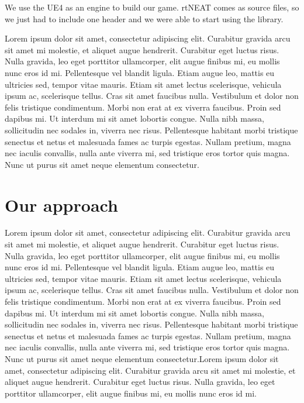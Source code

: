 \documentclass[conference]{acmsiggraph}
\begin{document}
We use the UE4 as an engine to build our game. rtNEAT comes as source files, so we just had to include one header and we were able to start using the library.

Lorem ipsum dolor sit amet, consectetur adipiscing elit. Curabitur gravida arcu sit amet mi molestie, et aliquet augue hendrerit. Curabitur eget luctus risus. Nulla gravida, leo eget porttitor ullamcorper, elit augue finibus mi, eu mollis nunc eros id mi. Pellentesque vel blandit ligula. Etiam augue leo, mattis eu ultricies sed, tempor vitae mauris. Etiam sit amet lectus scelerisque, vehicula ipsum ac, scelerisque tellus. Cras sit amet faucibus nulla. Vestibulum et dolor non felis tristique condimentum. Morbi non erat at ex viverra faucibus. Proin sed dapibus mi. Ut interdum mi sit amet lobortis congue. Nulla nibh massa, sollicitudin nec sodales in, viverra nec risus. Pellentesque habitant morbi tristique senectus et netus et malesuada fames ac turpis egestas. Nullam pretium, magna nec iaculis convallis, nulla ante viverra mi, sed tristique eros tortor quis magna. Nunc ut purus sit amet neque elementum consectetur.

\section{Our approach}

Lorem ipsum dolor sit amet, consectetur adipiscing elit. Curabitur gravida arcu sit amet mi molestie, et aliquet augue hendrerit. Curabitur eget luctus risus. Nulla gravida, leo eget porttitor ullamcorper, elit augue finibus mi, eu mollis nunc eros id mi. Pellentesque vel blandit ligula. Etiam augue leo, mattis eu ultricies sed, tempor vitae mauris. Etiam sit amet lectus scelerisque, vehicula ipsum ac, scelerisque tellus. Cras sit amet faucibus nulla. Vestibulum et dolor non felis tristique condimentum. Morbi non erat at ex viverra faucibus. Proin sed dapibus mi. Ut interdum mi sit amet lobortis congue. Nulla nibh massa, sollicitudin nec sodales in, viverra nec risus. Pellentesque habitant morbi tristique senectus et netus et malesuada fames ac turpis egestas. Nullam pretium, magna nec iaculis convallis, nulla ante viverra mi, sed tristique eros tortor quis magna. Nunc ut purus sit amet neque elementum consectetur.Lorem ipsum dolor sit amet, consectetur adipiscing elit. Curabitur gravida arcu sit amet mi molestie, et aliquet augue hendrerit. Curabitur eget luctus risus. Nulla gravida, leo eget porttitor ullamcorper, elit augue finibus mi, eu mollis nunc eros id mi.


\nocite{*}

\end{document}
